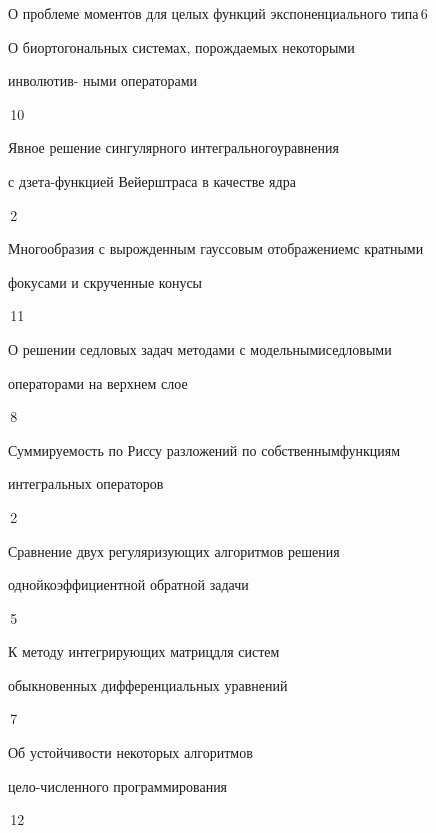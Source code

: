 

{О проблеме моментов для целых функций экспоненциального типа}{\No\,6}




{О биортогональных системах, порождаемых некоторыми  


инволютив- \newline ными операторами}{\No\,10}




{Явное решение сингулярного интегрального\newline уравнения


с дзета-функцией Вейерштраса в качестве ядра}{\No\,2}




{Многообразия с вырожденным гауссовым отображением\newline с кратными


фокусами и скрученные конусы}{\No\,11}




{О решении седловых задач методами с модельными\newline седловыми


операторами на верхнем слое}{\No\,8}




{Суммируемость по Риссу разложений по собственным\newline функциям


интегральных операторов}{\No\,2}




{Сравнение двух регуляризующих алгоритмов решения 


одной\newline коэффициентной обратной задачи}{\No\,5}




{К методу интегрирующих матриц\newline для систем


обыкновенных дифференциальных уравнений}{\No\,7}




{Об устойчивости некоторых алгоритмов 


цело-\newline численного программирования}{\No\,12}




